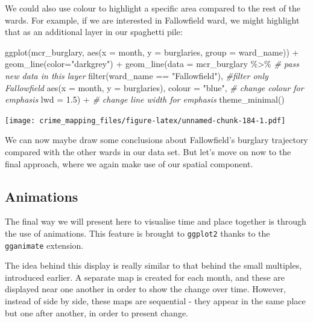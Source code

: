 \documentclass[
  krantz2]{krantz}
\makeatletter
\newenvironment{Shaded}{\begin{snugshade}}{\end{snugshade}}
\newcommand{\AttributeTok}[1]{\textcolor[rgb]{0.61,0.61,0.61}{#1}}
\newcommand{\CommentTok}[1]{\textcolor[rgb]{0.37,0.37,0.37}{\textit{#1}}}
\newcommand{\FloatTok}[1]{\textcolor[rgb]{0.06,0.06,0.06}{#1}}
\newcommand{\FunctionTok}[1]{\textcolor[rgb]{0,0,0}{#1}}
\newcommand{\NormalTok}[1]{#1}
\newcommand{\SpecialCharTok}[1]{\textcolor[rgb]{0,0,0}{#1}}
\newcommand{\StringTok}[1]{\textcolor[rgb]{0.5,0.5,0.5}{#1}}
\newenvironment{kframe}{%
\medskip{}
\setlength{\fboxsep}{.8em}
 \def\at@end@of@kframe{}%
 \ifinner\ifhmode%
  \def\at@end@of@kframe{\end{minipage}}%
  \begin{minipage}{\columnwidth}%
 \fi\fi%
 \def\FrameCommand##1{\hskip\@totalleftmargin \hskip-\fboxsep
 \colorbox{shadecolor}{##1}\hskip-\fboxsep
     \hskip-\linewidth \hskip-\@totalleftmargin \hskip\columnwidth}%
 \MakeFramed {\advance\hsize-\width
   \@totalleftmargin\z@ \linewidth\hsize
   \@setminipage}}%
 {\par\unskip\endMakeFramed%
 \at@end@of@kframe}
\renewenvironment{Shaded}{\begin{kframe}}{\end{kframe}}
\makeatother
\begin{document}
We could also use colour to highlight a specific area compared to the rest of the wards. For example, if we are interested in Fallowfield ward, we might highlight that as an additional layer in our spaghetti pile:

\begin{Shaded}
\begin{Highlighting}[]
\FunctionTok{ggplot}\NormalTok{(mcr\_burglary, }
       \FunctionTok{aes}\NormalTok{(}\AttributeTok{x =}\NormalTok{ month, }
           \AttributeTok{y =}\NormalTok{ burglaries, }
           \AttributeTok{group =}\NormalTok{ ward\_name)) }\SpecialCharTok{+} 
  \FunctionTok{geom\_line}\NormalTok{(}\AttributeTok{color=}\StringTok{"darkgrey"}\NormalTok{) }\SpecialCharTok{+} 
  \FunctionTok{geom\_line}\NormalTok{(}\AttributeTok{data =}\NormalTok{ mcr\_burglary }\SpecialCharTok{\%\textgreater{}\%}    \CommentTok{\# pass new data in this layer}
              \FunctionTok{filter}\NormalTok{(ward\_name }\SpecialCharTok{==} \StringTok{"Fallowfield"}\NormalTok{),  }\CommentTok{\#filter only Fallowfield }
            \FunctionTok{aes}\NormalTok{(}\AttributeTok{x =}\NormalTok{ month, }
           \AttributeTok{y =}\NormalTok{ burglaries), }
           \AttributeTok{colour =} \StringTok{"blue"}\NormalTok{,  }\CommentTok{\# change colour for emphasis}
           \AttributeTok{lwd =} \FloatTok{1.5}\NormalTok{) }\SpecialCharTok{+} \CommentTok{\# change line width for emphasis}
  \FunctionTok{theme\_minimal}\NormalTok{()}
\end{Highlighting}
\end{Shaded}

\texttt{[image: crime\_mapping\_files/figure-latex/unnamed-chunk-184-1.pdf]}

We can now maybe draw some conclusions about Fallowfield's burglary trajectory compared with the other wards in our data set. But let's move on now to the final approach, where we again make use of our spatial component.

\hypertarget{animations}{%
\subsection{Animations}\label{animations}}

The final way we will present here to visualise time and place together is through the use of animations. This feature is brought to \texttt{ggplot2} thanks to the \texttt{gganimate} extension.

The idea behind this display is really similar to that behind the small multiples, introduced earlier. A separate map is created for each month, and these are displayed near one another in order to show the change over time. However, instead of side by side, these maps are sequential - they appear in the same place but one after another, in order to present change.
\end{document}
